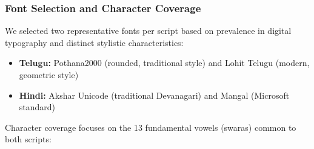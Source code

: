 \documentclass[review]{elsarticle}
\begin{document}
\subsubsection{Font Selection and Character Coverage}

We selected two representative fonts per script based on prevalence in digital typography and distinct stylistic characteristics:

\begin{itemize}
\item \textbf{Telugu:} Pothana2000 (rounded, traditional style) and Lohit Telugu (modern, geometric style)
\item \textbf{Hindi:} Akshar Unicode (traditional Devanagari) and Mangal (Microsoft standard)
\end{itemize}

Character coverage focuses on the 13 fundamental vowels (swaras) common to both scripts:
\end{document}
